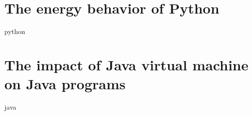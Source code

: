 \newpage
% 

\chapter{The energy behavior of Python}
\label{chapter:python}
{python}

\chapter{The impact of Java virtual machine on Java programs}
\label{chapter:java}
{java}